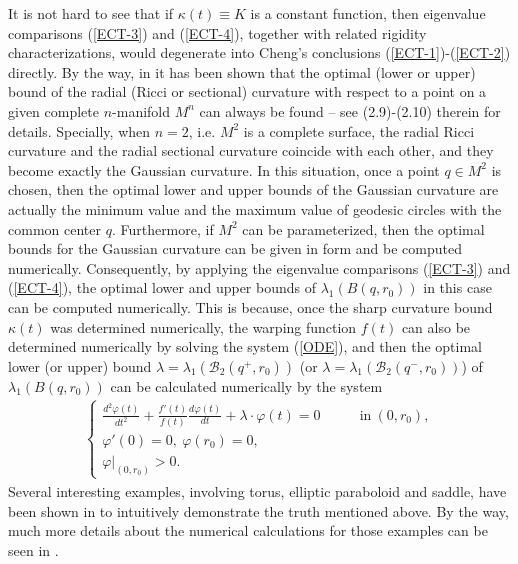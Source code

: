 \documentclass[12pt]{article}
\begin{document}
It is not hard to see that if $\kappa(t)\equiv K$ is a constant
function, then eigenvalue comparisons (\ref{ECT-3}) and
(\ref{ECT-4}), together with related rigidity characterizations,
would degenerate into Cheng's conclusions
(\ref{ECT-1})-(\ref{ECT-2}) directly. By the way, in \cite[Section
2]{FMI} it has been shown that the optimal (lower or upper) bound of
the radial (Ricci or sectional) curvature with respect to a point on
a given complete $n$-manifold $M^n$ can always be found -- see
(2.9)-(2.10) therein for details. Specially, when $n=2$, i.e. $M^2$
is a complete surface, the radial Ricci curvature and the radial
sectional curvature coincide with each other, and they become
exactly the Gaussian curvature. In this situation, once a point
$q\in M^2$ is chosen, then the optimal lower and upper bounds of the
Gaussian curvature are actually the minimum value and the maximum
value of geodesic circles with the common center $q$. Furthermore,
if $M^2$ can be parameterized, then the optimal bounds for the
Gaussian curvature can be given in form and be computed numerically.
Consequently, by applying the eigenvalue comparisons (\ref{ECT-3})
and (\ref{ECT-4}), the optimal lower and upper bounds of
$\lambda_{1}(B(q,r_0))$ in this case can be computed numerically.
This is because, once the sharp curvature bound $\kappa(t)$ was
determined numerically, the warping function $f(t)$ can also be
determined numerically by solving the system (\ref{ODE}), and then
the optimal lower (or upper) bound
$\lambda=\lambda_{1}(\mathscr{B}_{2}(q^{+},r_0))$ (or
$\lambda=\lambda_{1}(\mathscr{B}_{2}(q^{-},r_0))$) of
$\lambda_{1}(B(q,r_0))$ can be calculated numerically by the system
\begin{eqnarray*}
\left\{
\begin{array}{lll}
\frac{d^{2}\varphi(t)}{dt^{2}}+\frac{f'(t)}{f(t)}\frac{d\varphi(t)}{dt}+\lambda\cdot\varphi(t)=0 \qquad &\mathrm{in}~\left(0,r_0\right),  \\[1mm]
\varphi'(0)=0,~\varphi\left(r_0\right)=0, \\[0.5mm]
 \varphi|_{(0,r_0)}>0.
\end{array} \right.
\end{eqnarray*}
Several interesting examples, involving torus, elliptic paraboloid
and saddle, have been shown in \cite[Section 6]{FMI} to intuitively
demonstrate the truth mentioned above. By the way, much more details
about the numerical calculations for those examples can be seen in
\cite[Section 2.5, Chapter 2]{JM3}.
\end{document}
